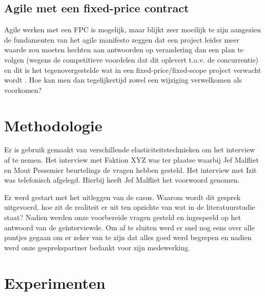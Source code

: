 \documentclass{hogent-article}
\begin{document}
    \subsection{Agile met een fixed-price contract}
    Agile werken met een FPC is mogelijk, maar blijkt zeer moeilijk te zijn aangezien de fundamenten van het agile manifesto zeggen dat een project leider meer waarde zou moeten hechten aan antwoorden op verandering dan een plan te volgen (wegens de competitieve voordelen dat dit oplevert t.o.v. de concurrentie) en dit is het tegenovergestelde wat in een fixed-price/fixed-scope project verwacht wordt \autocite{PMI2011}. Hoe kan men dan tegelijkertijd zowel een wijziging verwelkomen als voorkomen?
	
	\section{Methodologie}
	Er is gebruik gemaakt van verschillende elasticiteitstechnieken om het interview af te nemen. Het interview met Faktion XYZ was ter plaatse waarbij Jef Malfliet en Mout Pessemier beurtelings de vragen hebben gesteld. Het interview met Izit was telefonisch afgelegd. Hierbij heeft Jef Malfliet het voorwoord genomen.
	
	Er werd gestart met het uitleggen van de casus. Waarom wordt dit gesprek uitgevoerd, hoe zit de realiteit er uit ten opzichte van wat in de literatuurstudie staat? Nadien werden onze voorbereide vragen gesteld en ingespeeld op het antwoord van de geïnterviewde. Om af te sluiten werd er snel nog eens over alle puntjes gegaan om er zeker van te zijn dat alles goed werd begrepen en nadien werd onze gesprekspartner bedankt voor zijn medewerking.
	
	\section{Experimenten}
\end{document}
